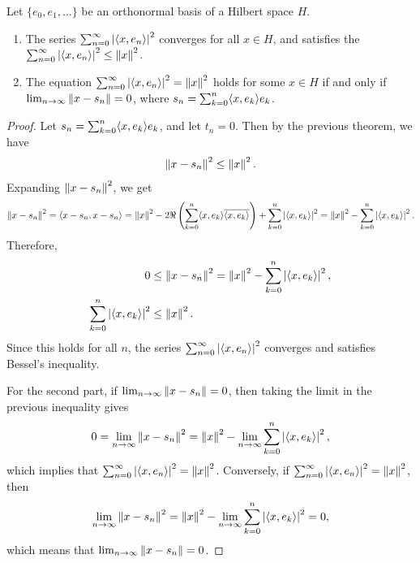\begin{theorem}
    Let $\{e_{0},e_{1},\ldots\}$ be an orthonormal basis of a Hilbert space $H$.
    \begin{enumerate}
        \item The series $\sum_{n=0}^{\infty} \left| \langle x,e_{n}\rangle \right|^{2}$ converges for all $x \in H$, and satisfies the  $\sum_{n=0}^{\infty} \left| \langle x,e_{n}\rangle \right|^{2} \leq \left\lVert x\right\rVert^{2}$.
        \item The equation $\sum_{n=0}^{\infty} \left| \langle x,e_{n}\rangle \right|^{2} = \left\lVert x\right\rVert^{2}$ holds for some $x \in H$ if and only if $\lim_{n \to \infty} \left\lVert x-s_{n}\right\rVert = 0$, where $s_{n} = \sum_{k=0}^{n} \langle x,e_{k}\rangle e_{k}$.
    \end{enumerate}
\end{theorem}

\begin{proof}
    Let $s_{n} = \sum_{k=0}^{n} \langle x,e_{k}\rangle e_{k}$, and let $t_{n} = 0$. Then by the previous theorem, we have
    \begin{align}
        \left\lVert x-s_{n}\right\rVert^{2} \leq \left\lVert x\right\rVert^{2}.
    \end{align}
    Expanding $\left\lVert x-s_{n}\right\rVert^{2}$, we get
    \begin{align}
        \left\lVert x-s_{n}\right\rVert^{2} = \langle x-s_{n},x-s_{n}\rangle = \left\lVert x\right\rVert^{2} - 2\Re\left(\sum_{k=0}^{n} \langle x,e_{k}\rangle\overline{\langle x,e_{k}\rangle}\right) + \sum_{k=0}^{n} \left| \langle x,e_{k}\rangle \right|^{2} = \left\lVert x\right\rVert^{2} - \sum_{k=0}^{n} \left| \langle x,e_{k}\rangle \right|^{2}.
    \end{align}
    Therefore,
    \begin{align}
        0 &\leq \left\lVert x-s_{n}\right\rVert^{2} = \left\lVert x\right\rVert^{2} - \sum_{k=0}^{n} \left| \langle x,e_{k}\rangle \right|^{2},\\
        \sum_{k=0}^{n} \left| \langle x,e_{k}\rangle \right|^{2} &\leq \left\lVert x\right\rVert^{2}.
    \end{align}
    Since this holds for all $n$, the series $\sum_{n=0}^{\infty} \left| \langle x,e_{n}\rangle \right|^{2}$ converges and satisfies Bessel's inequality.

    For the second part, if $\lim_{n \to \infty} \left\lVert x-s_{n}\right\rVert = 0$, then taking the limit in the previous inequality gives
    \begin{align}
        0 = \lim_{n\to\infty}\left\lVert x-s_n\right\rVert^2 = \left\lVert x\right\rVert^{2}-\lim_{n\to\infty}\sum_{k=0}^{n}\left| \langle x,e_k\rangle \right|^2,
    \end{align}
    which implies that $\sum_{n=0}^{\infty}\left| \langle x,e_n\rangle \right|^2=\left\lVert x\right\rVert^2$. Conversely, if $\sum_{n=0}^{\infty}\left| \langle x,e_n\rangle \right|^2=\left\lVert x\right\rVert^2$, then
    \begin{align}
        \lim_{n\to\infty}\left\lVert x-s_n\right\rVert^2 = \left\lVert x\right\rVert^{2}-\lim_{n\to\infty}\sum_{k=0}^{n}\left| \langle x,e_k\rangle \right|^2 = 0,
    \end{align}
    which means that $\lim_{n \to \infty} \left\lVert x-s_{n}\right\rVert = 0$.
\end{proof}

